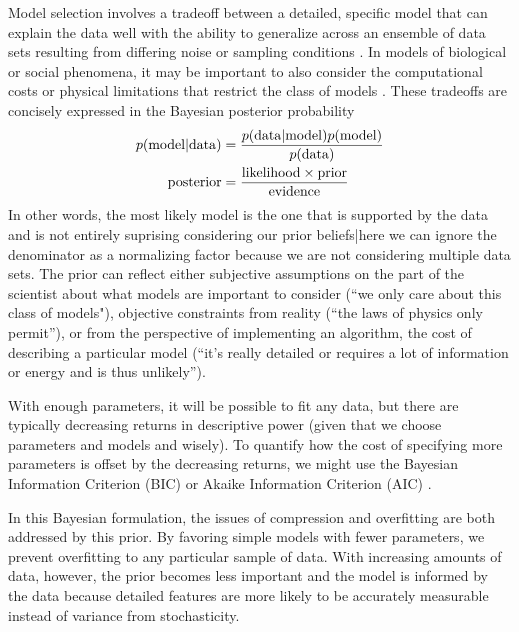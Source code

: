 \documentclass[aps,prl,twocolumn]{revtex4-1}
\begin{document}
Model selection involves a tradeoff between a detailed, specific model that can explain the data well with the ability to generalize across an ensemble of data sets resulting from differing noise or sampling conditions \cite{MacKay:2005wc}. In models of biological or social phenomena, it may be important to also consider the computational costs or physical limitations that restrict the class of models \cite{Daniels:1cq}. These tradeoffs are concisely expressed in the Bayesian posterior probability
\begin{align}
	p({\rm model}|{\rm data}) &= \frac{p({\rm data}|{\rm model})p({\rm model})}{p({\rm data})}\\
	{\rm posterior} &= \frac{{\rm likelihood}\times{\rm prior}}{{\rm evidence}}
\end{align}
In other words, the most likely model is the one that is supported by the data and is not entirely suprising considering our prior beliefs|here we can ignore the denominator as a normalizing factor because we are not considering multiple data sets. The prior can reflect either subjective assumptions on the part of the scientist about what models are important to consider (``we only care about this class of models"), objective constraints from reality (``the laws of physics only permit''), or from the perspective of implementing an algorithm, the cost of describing a particular model (``it's really detailed or requires a lot of information or energy and is thus unlikely''). 

With enough parameters, it will be possible to fit any data, but there are typically decreasing returns in descriptive power (given that we choose parameters and models and wisely). 
To quantify how the cost of specifying more parameters is offset by the decreasing returns, we might use the Bayesian Information Criterion (BIC) or Akaike Information Criterion (AIC) \cite{Lee:2015ev}.

In this Bayesian formulation, the issues of compression and overfitting are both addressed by this prior. By favoring simple models with fewer parameters, we prevent overfitting to any particular sample of data. With increasing amounts of data, however, the prior becomes less important and the model is informed by the data because detailed features are more likely to be accurately measurable instead of variance from stochasticity.
\end{document}

